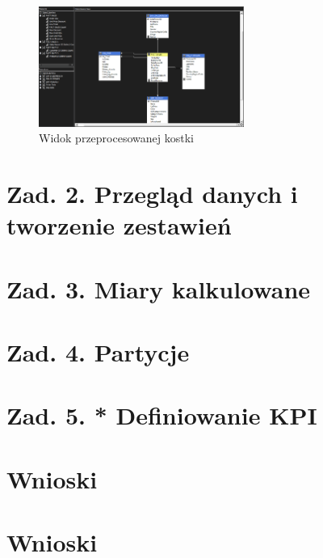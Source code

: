 \documentclass[a4paper,12pt]{article}
\begin{document}
\begin{figure}[H]
  \includegraphics[width=0.6\textwidth]{images/1d.png}
  \caption{Widok przeprocesowanej kostki}
\end{figure}

\section{Zad. 2. Przegląd danych i tworzenie zestawień}
\section{Zad. 3. Miary kalkulowane}
\section{Zad. 4. Partycje}
\section{Zad. 5. * Definiowanie KPI}
\section{Wnioski}

\section{Wnioski}

\printbibliography
\end{document}
